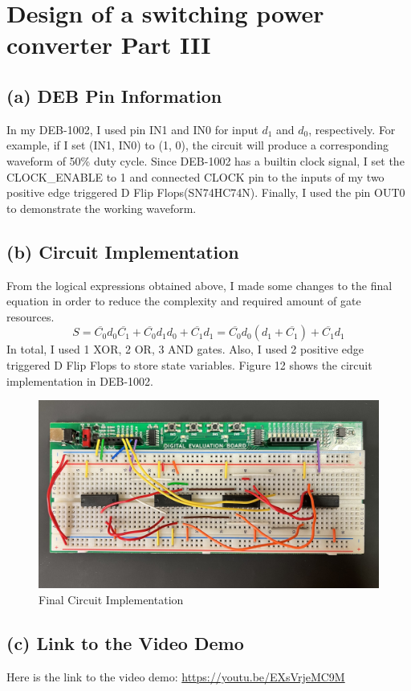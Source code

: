 \documentclass{article}
\begin{document}
\section*{Design of a switching power converter Part III}
\subsection*{(a) DEB Pin Information}
In my DEB-1002, I used pin IN1 and IN0 for input $d_1$ and $d_0$, respectively. For example, if I set (IN1, IN0) to (1, 0), the circuit will produce a corresponding waveform of 50\% duty cycle. \newline
Since DEB-1002 has a builtin clock signal, I set the CLOCK\_ENABLE to 1 and connected CLOCK pin to the inputs of my two positive edge triggered D Flip Flops(SN74HC74N). Finally, I used the pin OUT0 to demonstrate the working waveform.

\subsection*{(b) Circuit Implementation}
From the logical expressions obtained above, I made some changes to the final equation in order to reduce the complexity and required amount of gate resources.
\begin{equation}
    S = \overline{C_0} d_0 \overline{C_1} + \overline{C_0} d_1 d_0 + \overline{C_1} d_1 = \overline{C_0} d_0 (d_1 + \overline{C_1}) + \overline{C_1} d_1
\end{equation}
In total, I used 1 XOR, 2 OR, 3 AND gates. Also, I used 2 positive edge triggered D Flip Flops to store state variables. Figure 12 shows the circuit implementation in DEB-1002.
\begin{figure}[!ht]
    \centering
    \includegraphics*[width=.9\linewidth]{src/Final Circuit Implementation.jpg}
    \caption{Final Circuit Implementation}
\end{figure}

\subsection*{(c) Link to the Video Demo}
Here is the link to the video demo: \url{https://youtu.be/EXsVrjeMC9M}
\end{document}
